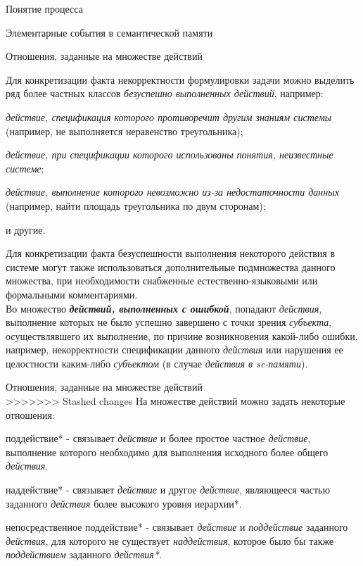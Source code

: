 \begin{frame}{\large Понятие процесса}
\begin{frame}{\large Элементарные события в семантической памяти}
\begin{frame}{Отношения, заданные на множестве действий}
\begin{frame}{}
Для конкретизации факта некорректности формулировки задачи можно выделить ряд более частных классов \textit{безуспешно выполненных действий}, например:
\begin{textitemize}
	\item \textit{действие, спецификация которого противоречит другим знаниям системы} (например, не выполняется неравенство треугольника);
	\item \textit{действие, при спецификации которого использованы понятия, неизвестные системе};
	\item \textit{действие, выполнение которого невозможно из-за недостаточности данных} (например, найти площадь треугольника по двум сторонам);
	\item и другие.
\end{textitemize}
\end{frame}

\begin{frame}{}
Для конкретизации факта безуспешности выполнения некоторого действия в системе могут также использоваться дополнительные подмножества данного множества, при необходимости снабженные естественно-языковыми или формальными комментариями.\\

Во множество \textbf{\textit{действий, выполненных с ошибкой}}, попадают \textit{действия}, выполнение которых не было успешно завершено с точки зрения \textit{субъекта}, осуществлявшего их выполнение, по причине возникновения какой-либо ошибки, например, некорректности спецификации данного \textit{действия} или нарушения ее целостности каким-либо \textit{субъектом} (в случае \textit{действия в sc-памяти}).
\end{frame}

\begin{frame}{Отношения, заданные на множестве действий}
\topline
 \\
 \bigskip
>>>>>>> Stashed changes
    На множестве действий можно задать некоторые отношения:
    \begin{textitemize}
        \item поддействие* - связывает \textit{действие} и более простое частное \textit{действие}, выполнение которого необходимо для выполнения исходного более общего \textit{действия}.
        \item наддействие* - связывает \textit{действие} и другое \textit{действие}, являющееся частью заданного \textit{действия} более высокого уровня иерархии*.
        \item непосредственное поддействие* - связывает \textit{действие} и \textit{поддействие} заданного \textit{действия}, для которого не существует \textit{наддействия}, которое было бы также \textit{поддействием} заданного \textit{действия*}.
    \end{textitemize}
\end{frame}


\end{frame}
\end{frame}
\end{frame}
